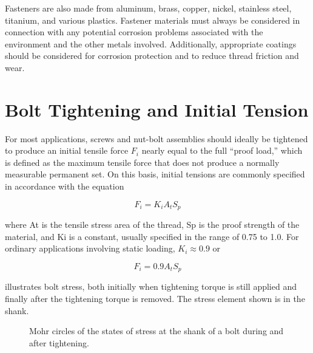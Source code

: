 \documentclass[
10pt,
a4paper,
openany,
svgnames,
]{book}
\begin{document}
Fasteners are also made from aluminum, brass, copper, nickel, stainless steel, titanium, and various plastics. Fastener materials must always be considered in connection with any potential corrosion problems associated with the environment and the other metals involved. Additionally, appropriate coatings should be considered for corrosion protection and to reduce thread friction and wear.

\section{Bolt Tightening and Initial Tension}

For most applications, screws and nut-bolt assemblies should ideally be tightened to produce an initial tensile force $F_i$ nearly equal to the full “proof load,” which is defined as the maximum tensile force that does not produce a normally measurable permanent set. On this basis, initial tensions are commonly specified in accordance with the equation

\[F_i = K_iA_tS_p\]

where At is the tensile stress area of the thread, Sp is the proof strength of the material, and Ki is a constant, usually specified in the range of 0.75 to 1.0. For ordinary applications involving static loading, $K_i \approx 0.9$ or

\begin{equation}
  F_i = 0.9A_tS_p
\end{equation}

 illustrates bolt stress, both initially when tightening torque is still applied and finally after the tightening torque is removed. The stress element shown is in the shank.

\begin{figure}[h]
  \centering
  \caption{Mohr circles of the states of stress at the shank of a bolt during and after tightening.}
  \label{fig: bolt mohr circles}
\end{figure}
\end{document}
